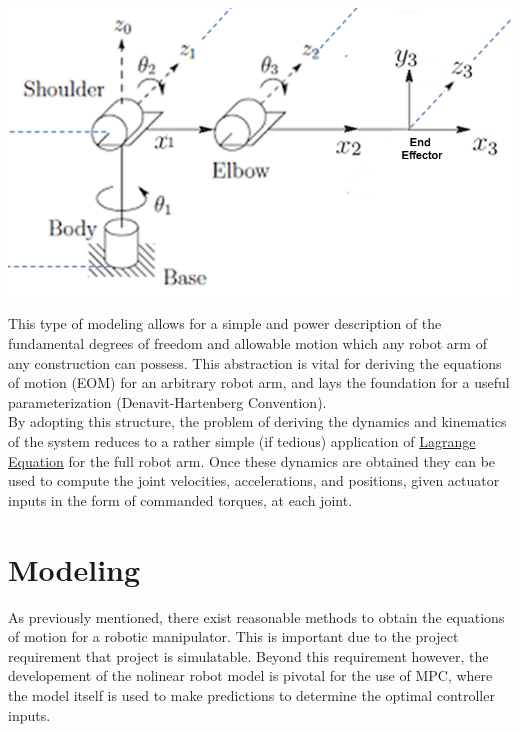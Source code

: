 \documentclass[12px]{article}
\begin{document}
\begin{enumerate}
            \begin{center}
                \includegraphics[scale=0.5]{3dof_robot}
            \end{center}

            \noindent This type of modeling allows for a simple and power description of the fundamental degrees of freedom and allowable motion which any robot arm of any construction can possess. This abstraction is vital for deriving the equations of motion (EOM) for an arbitrary robot arm, and lays the foundation for a useful parameterization (Denavit-Hartenberg Convention).\\

            \noindent By adopting this structure, the problem of deriving the dynamics and kinematics of the system reduces to a rather simple (if tedious) application of \underline{Lagrange Equation} for the full robot arm. Once these dynamics are obtained they can be used to compute the joint velocities, accelerations, and positions, given actuator inputs in the form of commanded torques, at each joint.

        \end{enumerate}


    \section*{Modeling}

    As previously mentioned, there exist reasonable methods to obtain the equations of motion for a robotic manipulator. This is important due to the project requirement that project is simulatable. Beyond this requirement however, the developement of the nolinear robot model is pivotal for the use of MPC, where the model itself is used to make predictions to determine the optimal controller inputs. \\
\end{document}
